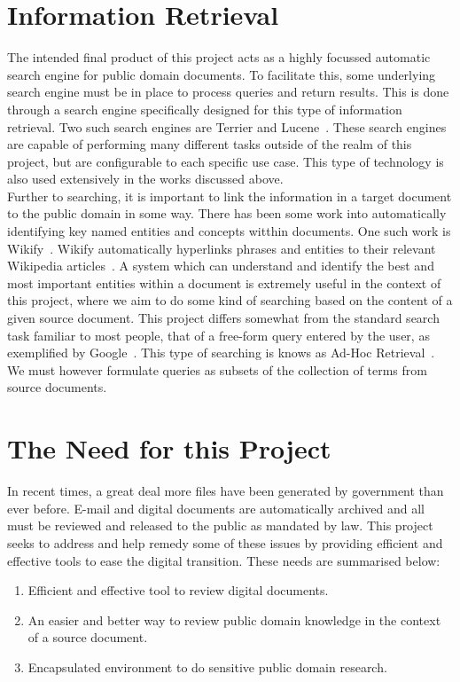 \documentclass{l4proj}
\begin{document}
\section{Information Retrieval}
The intended final product of this project acts as a highly focussed automatic search engine for public domain documents. To facilitate this, some underlying search engine must be in place to process queries and return results. This is done through a search engine specifically designed for this type of information retrieval. Two such search engines are Terrier and Lucene~\cite{macdonald2012puppy, terrier, lucene}. These search engines are capable of performing many different tasks outside of the realm of this project, but are configurable to each specific use case. This type of technology is also used extensively in the works discussed above. \\
Further to searching, it is important to link the information in a target document to the public domain in some way.
There has been some work into automatically identifying key named entities and concepts witthin documents. One such work is Wikify~\cite{Mihalcea:2007:WLD:1321440.1321475}. Wikify automatically hyperlinks phrases and entities to their relevant Wikipedia articles~\cite{wikipedia}. A system which can understand and identify the best and most important entities within a document is extremely useful in the context of this project, where we aim to do some kind of searching based on the content of a given source document.
This project differs somewhat from the standard search task familiar to most people, that of a free-form query entered by the user, as exemplified by Google~\cite{google}. This type of searching is knows as Ad-Hoc Retrieval~\cite{baeza1999modern}. We must however formulate queries as subsets of the collection of terms from source documents.
\section{The Need for this Project}
In recent times, a great deal more files have been generated by government than ever before. E-mail and digital documents are automatically archived and all must be reviewed and released to the public as mandated by law.
This project seeks to address and help remedy some of these issues by providing efficient and effective tools to ease the digital transition.
These needs are summarised below:
\begin{center}
\begin{enumerate}[label=\textbf{Need.\arabic*}]
\item Efficient and effective tool to review digital documents.
\item An easier and better way to review public domain knowledge in the context of a source document.
\item Encapsulated environment to do sensitive public domain research.
\end{enumerate}
\end{center}
\end{document}
